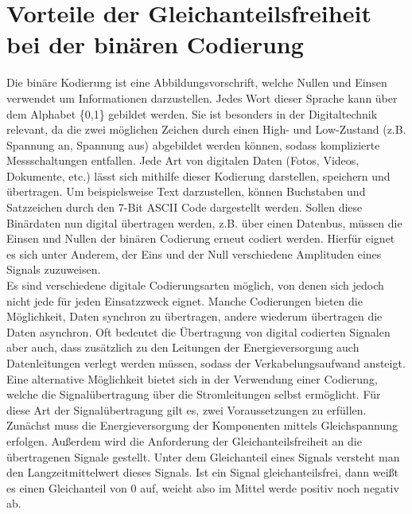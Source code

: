 \section{Vorteile der Gleichanteilsfreiheit bei der binären Codierung}
Die binäre Kodierung ist eine Abbildungsvorschrift, welche Nullen und Einsen verwendet
um Informationen darzustellen. Jedes Wort dieser Sprache kann über dem Alphabet \{0,1\} gebildet werden.
Sie ist besonders in der Digitaltechnik relevant, da die zwei möglichen Zeichen durch
einen High- und Low-Zustand (z.B. Spannung an, Spannung aus) abgebildet werden können, sodass komplizierte Messschaltungen entfallen.\autocite[379]{Fricke2003}
Jede Art von digitalen Daten (Fotos, Videos, Dokumente, etc.) lässt sich mithilfe dieser Kodierung
darstellen, speichern und übertragen. Um beispielsweise Text darzustellen, können Buchstaben und Satzzeichen
durch den 7-Bit ASCII Code dargestellt werden.
Sollen diese Binärdaten nun digital übertragen werden, z.B. über einen Datenbus, müssen die Einsen und Nullen
der binären Codierung erneut codiert werden. Hierfür eignet es sich unter Anderem, der Eins und der Null
verschiedene Amplituden eines Signals zuzuweisen.\\
Es sind verschiedene digitale Codierungsarten möglich, von denen sich jedoch nicht jede für jeden Einsatzzweck eignet.
Manche Codierungen bieten die Möglichkeit, Daten synchron zu übertragen, andere wiederum übertragen die Daten asynchron.
Oft bedeutet die Übertragung von digital codierten Signalen aber auch, dass zusätzlich zu den Leitungen der Energieversorgung auch 
Datenleitungen verlegt werden müssen, sodass der Verkabelungsaufwand ansteigt. Eine alternative Möglichkeit bietet sich 
in der Verwendung einer Codierung, welche die Signalübertragung über die Stromleitungen selbst ermöglicht.
Für diese Art der Signalübertragung gilt es, zwei Voraussetzungen zu erfüllen. Zunächst muss die Energieversorgung der
Komponenten mittels Gleichspannung erfolgen. Außerdem wird die Anforderung der Gleichanteilsfreiheit an die übertragenen
Signale gestellt. \autocite[55]{Schnell2019}
Unter dem Gleichanteil eines Signals versteht man den Langzeitmittelwert dieses Signals. Ist ein Signal gleichanteilsfrei, dann
weißt es einen Gleichanteil von 0 auf, weicht also im Mittel werde positiv noch negativ ab. \\

